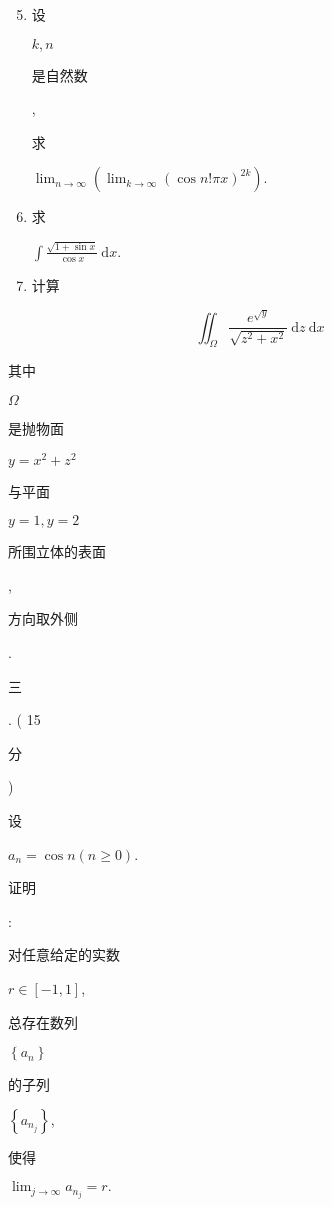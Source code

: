 \documentclass[10pt]{article}
\begin{document}
\begin{enumerate}
  \setcounter{enumi}{4}
  \item \begin{CJK}{UTF8}{mj}设\end{CJK} $k, n$ \begin{CJK}{UTF8}{mj}是自然数\end{CJK}, \begin{CJK}{UTF8}{mj}求\end{CJK} $\lim _{n \rightarrow \infty}\left(\lim _{k \rightarrow \infty}(\cos n ! \pi x)^{2 k}\right)$.

  \item \begin{CJK}{UTF8}{mj}求\end{CJK} $\int \frac{\sqrt{1+\sin x}}{\cos x} \mathrm{~d} x$.

  \item \begin{CJK}{UTF8}{mj}计算\end{CJK}

\end{enumerate}
$$
\iint_{\Omega} \frac{e^{\sqrt{y}}}{\sqrt{z^{2}+x^{2}}} \mathrm{~d} z \mathrm{~d} x
$$
\begin{CJK}{UTF8}{mj}其中\end{CJK} $\Omega$ \begin{CJK}{UTF8}{mj}是抛物面\end{CJK} $y=x^{2}+z^{2}$ \begin{CJK}{UTF8}{mj}与平面\end{CJK} $y=1, y=2$ \begin{CJK}{UTF8}{mj}所围立体的表面\end{CJK}, \begin{CJK}{UTF8}{mj}方向取外侧\end{CJK}.

\begin{CJK}{UTF8}{mj}三\end{CJK}. ( 15 \begin{CJK}{UTF8}{mj}分\end{CJK}) \begin{CJK}{UTF8}{mj}设\end{CJK} $a_{n}=\cos n(n \geqslant 0)$. \begin{CJK}{UTF8}{mj}证明\end{CJK}: \begin{CJK}{UTF8}{mj}对任意给定的实数\end{CJK} $r \in[-1,1]$, \begin{CJK}{UTF8}{mj}总存在数列\end{CJK} $\left\{a_{n}\right\}$ \begin{CJK}{UTF8}{mj}的子列\end{CJK} $\left\{a_{n_{j}}\right\}$, \begin{CJK}{UTF8}{mj}使得\end{CJK} $\lim _{j \rightarrow \infty} a_{n_{j}}=r .$
\end{document}
